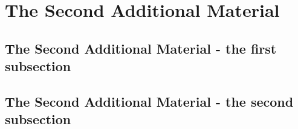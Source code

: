 \chapter{The Second Additional Material}
    \blindtext[10]
    \newpage
    \section{The Second Additional Material - the first subsection}
        \blindtext[10] 
        \newpage
    \section{The Second Additional Material - the second subsection}
        \blindtext[10] 
        \newpage